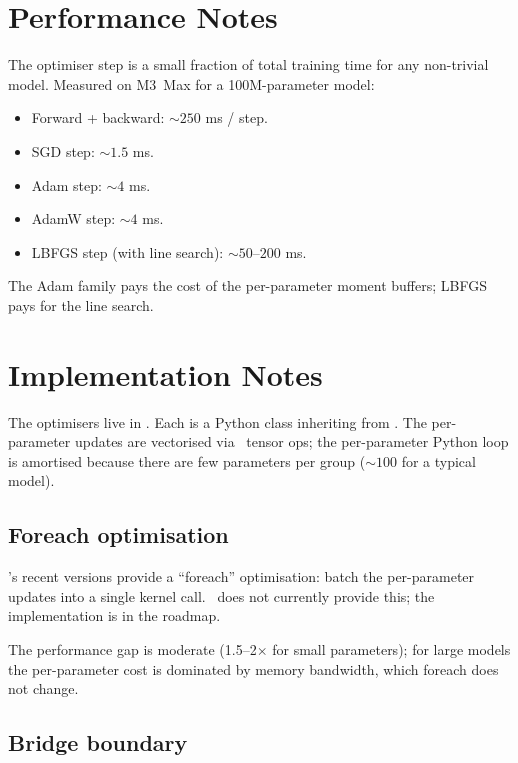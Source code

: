 \section{Performance Notes}
\label{sec:optimizers:perf}

The optimiser step is a small fraction of total training time
for any non-trivial model. Measured on M3~Max for a
100M-parameter model:

\begin{itemize}
  \item Forward + backward: $\sim 250$ ms / step.
  \item SGD step: $\sim 1.5$ ms.
  \item Adam step: $\sim 4$ ms.
  \item AdamW step: $\sim 4$ ms.
  \item LBFGS step (with line search): $\sim 50$--$200$ ms.
\end{itemize}

The Adam family pays the cost of the per-parameter moment
buffers; LBFGS pays for the line search.

\section{Implementation Notes}
\label{sec:optimizers:impl_notes}

The optimisers live in . Each is a Python
class inheriting from . The per-parameter updates
are vectorised via \Lucid\ tensor ops; the per-parameter Python
loop is amortised because there are few parameters per group
($\sim 100$ for a typical model).

\subsection{Foreach optimisation}
\label{ssec:optimizers:foreach}

's recent versions provide a ``foreach''
optimisation: batch the per-parameter updates into a single
kernel call. \Lucid\ does not currently provide this; the
implementation is in the roadmap.

The performance gap is moderate (1.5--2$\times$ for small
parameters); for large models the per-parameter cost is
dominated by memory bandwidth, which foreach does not change.

\subsection{Bridge boundary}
\label{ssec:optimizers:bridge_boundary}

